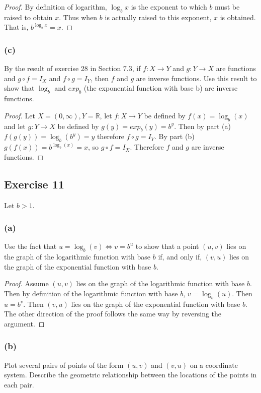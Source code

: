 \documentclass[14pt]{extarticle}
\newcommand{\R}{\mathbb{R}}
\begin{document}
\begin{proof}
    By definition of logarithm,  \(\log_b x\) is the exponent to which \(b\) must be raised to obtain \(x\). Thus when \(b\) is
    actually raised to this exponent, \(x\) is obtained. That is, \(b^{\log_b x} = x\).
\end{proof}

\subsubsection{(c)}
By the result of exercise 28 in Section 7.3, if \(f: X \to Y\) and \(g: Y \to X\) are functions and \(g \circ f = I_X\) and
\(f \circ g = I_Y\), then \(f\) and \(g\) are inverse functions. Use this result to show that \(\log_b\) and
\(exp_b\) (the exponential function with base b) are inverse functions.

\begin{proof}
    Let \(X = (0, \infty), Y = \R\), let \(f: X \to Y\) be defined by \(f(x) = \log_b(x)\) and let \(g: Y \to X\) be defined by
    \(g(y) = exp_b(y) = b^y\). Then by part (a) \(f(g(y)) = \log_b(b^y) = y\) therefore \(f \circ g = I_Y\). By part (b)
    \(g(f(x)) = b^{\log_b(x)} = x\), so \(g \circ f = I_X\). Therefore \(f\) and \(g\) are inverse functions.
\end{proof}

\subsection{Exercise 11}
Let \(b > 1\).

\subsubsection{(a)}
Use the fact that \(u = \log_b(v) \iff v = b^u\) to show that a point \((u, v)\) lies on the graph of the logarithmic
function with base \(b\) if, and only if, \((v, u)\) lies on the graph of the exponential function with base \(b\).

\begin{proof}
    Assume \((u, v)\) lies on the graph of the logarithmic
    function with base \(b\). Then by definition of the
    logarithmic function with base \(b\), \(v = \log_b(u)\). Then \(u = b^v\). Then \((v, u)\) lies on the graph of the
    exponential function with base \(b\). The other direction of the proof follows the same way by reversing the argument.
\end{proof}

\subsubsection{(b)}
Plot several pairs of points of the form \((u, v)\) and \((v, u)\) on a coordinate system. Describe the geometric
relationship between the locations of the points in each pair.
\end{document}
